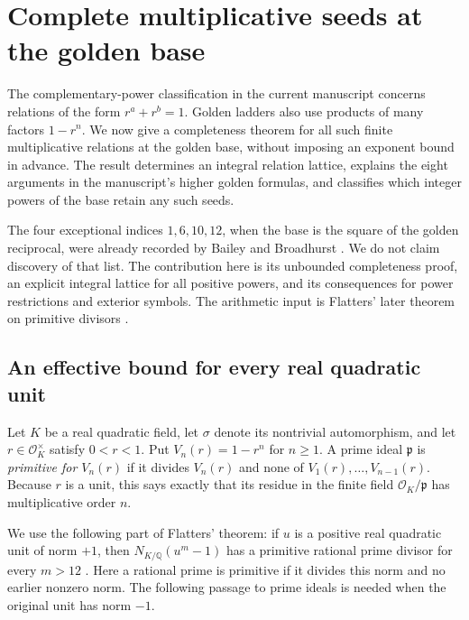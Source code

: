 \section{Complete multiplicative seeds at the golden base}
\label{golden:sec:complete-seeds}

The complementary-power classification in the current manuscript
\cite{ProveIt} concerns relations of the form $r^a+r^b=1$.
Golden ladders also use products of many factors $1-r^n$.
We now give a completeness theorem for all such finite multiplicative
relations at the golden base, without imposing an exponent bound in
advance.  The result determines an integral relation lattice, explains
the eight arguments in the manuscript's higher golden formulas, and
classifies which integer powers of the base retain any such seeds.

The four exceptional indices $1,6,10,12$, when the base is the square
of the golden reciprocal, were already recorded by Bailey and
Broadhurst \cite[\S2, preceding (22)]{BaileyBroadhurst1999}.
We do not claim discovery of that list.  The contribution here is its
unbounded completeness proof, an explicit integral lattice for all
positive powers, and its consequences for power restrictions and
exterior symbols.  The arithmetic input is Flatters' later theorem
on primitive divisors \cite{Flatters2009}.

\subsection{An effective bound for every real quadratic unit}
\label{golden:subsec:quadratic-cutoff}

Let $K$ be a real quadratic field, let $\sigma$ denote its nontrivial
automorphism, and let $r\in\mathcal O_K^\times$ satisfy $0<r<1$.
Put $V_n(r)=1-r^n$ for $n\ge1$.
A prime ideal $\mathfrak p$ is \emph{primitive for $V_n(r)$} if it
divides $V_n(r)$ and none of $V_1(r),\ldots,V_{n-1}(r)$.
Because $r$ is a unit, this says exactly that its residue in the finite
field $\mathcal O_K/\mathfrak p$ has multiplicative order $n$.

We use the following part of Flatters' theorem: if $u$ is a positive
real quadratic unit of norm $+1$, then
$N_{K/\mathbb Q}(u^m-1)$ has a primitive rational prime divisor for
every $m>12$ \cite[Theorem~1.4]{Flatters2009}.
Here a rational prime is primitive if it divides this norm and no
earlier nonzero norm.  The following passage to prime ideals is needed
when the original unit has norm $-1$.

